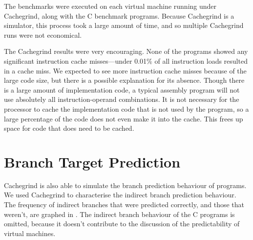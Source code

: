 		The benchmarks were executed on each virtual machine running under Cachegrind, along with the C benchmark programs. Because Cachegrind is a simulator, this process took a large amount of time, and so multiple Cachegrind runs were not economical. 
		
		The Cachegrind results were very encouraging. None of the programs showed any significant instruction cache misses---under 0.01\% of all instruction loads resulted in a cache miss. We expected to see more instruction cache misses because of the large code size, but there is a possible explanation for its absence. Though there is a large amount of implementation code, a typical assembly program will not use absolutely all instruction-operand combinations. It is not necessary for the processor to cache the implementation code that is not used by the program, so a large percentage of the code does not even make it into the cache. This frees up space for code that does need to be cached.
		
		\section{Branch Target Prediction}
		Cachegrind is also able to simulate the branch prediction behaviour of programs. We used Cachegrind to characterise the indirect branch prediction behaviour. The frequency of indirect branches that were predicted correctly, and those that weren't, are graphed in . The indirect branch behaviour of the C programs is omitted, because it doesn't contribute to the discussion of the predictability of virtual machines.
		

